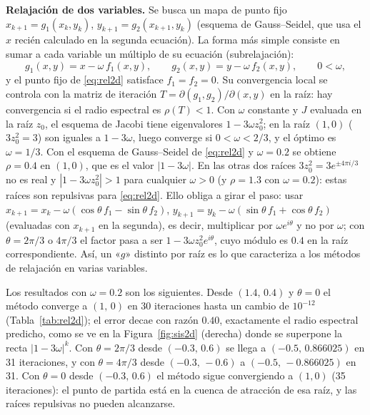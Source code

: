 \documentclass[11pt,a4paper]{article}
\begin{document}
\textbf{Relajación de dos variables.} Se busca un mapa de punto fijo $x_{k+1}=g_1(x_k,y_k)$, $y_{k+1}=g_2(x_{k+1},y_k)$ (esquema de Gauss--Seidel, que usa el $x$ recién calculado en la segunda ecuación). La forma más simple consiste en sumar a cada variable un múltiplo de su ecuación (subrelajación):
\begin{equation}
g_1(x,y)=x-\omega\,f_1(x,y),\qquad g_2(x,y)=y-\omega\,f_2(x,y),\qquad 0<\omega, \label{eq:rel2d}
\end{equation}
y el punto fijo de \eqref{eq:rel2d} satisface $f_1=f_2=0$. Su convergencia local se controla con la matriz de iteración $T=\partial(g_1,g_2)/\partial(x,y)$ en la raíz: hay convergencia si el radio espectral es $\rho(T)<1$. Con $\omega$ constante y $J$ evaluada en la raíz $z_0$, el esquema de Jacobi tiene eigenvalores $1-3\omega z_0^2$; en la raíz $(1,0)$ ($3z_0^2=3$) son iguales a $1-3\omega$, luego converge si $0<\omega<2/3$, y el óptimo es $\omega=1/3$. Con el esquema de Gauss--Seidel de \eqref{eq:rel2d} y $\omega=0.2$ se obtiene $\rho=0.4$ en $(1,0)$, que es el valor $|1-3\omega|$. En las otras dos raíces $3z_0^2=3e^{\pm4\pi i/3}$ no es real y $|1-3\omega z_0^2|>1$ para cualquier $\omega>0$ (y $\rho=1.3$ con $\omega=0.2$): estas raíces son repulsivas para \eqref{eq:rel2d}. Ello obliga a girar el paso: usar $x_{k+1}=x_k-\omega(\cos\theta\,f_1-\sin\theta\,f_2)$, $y_{k+1}=y_k-\omega(\sin\theta\,f_1+\cos\theta\,f_2)$ (evaluadas con $x_{k+1}$ en la segunda), es decir, multiplicar por $\omega e^{i\theta}$ y no por $\omega$; con $\theta=2\pi/3$ o $4\pi/3$ el factor pasa a ser $1-3\omega z_0^2e^{i\theta}$, cuyo módulo es $0.4$ en la raíz correspondiente. Así, un «$g$» distinto por raíz es lo que caracteriza a los métodos de relajación en varias variables.

Los resultados con $\omega=0.2$ son los siguientes. Desde $(1.4,\,0.4)$ y $\theta=0$ el método converge a $(1,\,0)$ en 30 iteraciones hasta un cambio de $10^{-12}$ (Tabla~\ref{tab:rel2d}); el error decae con razón $0.40$, exactamente el radio espectral predicho, como se ve en la Figura~\ref{fig:sis2d} (derecha) donde se superpone la recta $|1-3\omega|^k$. Con $\theta=2\pi/3$ desde $(-0.3,\,0.6)$ se llega a $(-0.5,\,0.866025)$ en 31 iteraciones, y con $\theta=4\pi/3$ desde $(-0.3,\,-0.6)$ a $(-0.5,\,-0.866025)$ en 31. Con $\theta=0$ desde $(-0.3,\,0.6)$ el método sigue convergiendo a $(1,0)$ (35 iteraciones): el punto de partida está en la cuenca de atracción de esa raíz, y las raíces repulsivas no pueden alcanzarse.

\begin{table}[H]\centering\small

\caption{Relajación de dos variables ($\theta=0$, $\omega=0.2$) desde $(1.4,\,0.4)$. La distancia a la raíz se reduce por un factor $\approx0.4$ en cada iteración.}\label{tab:rel2d}
\end{table}
\end{document}
